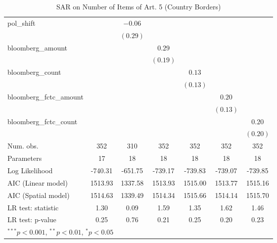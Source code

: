 \begin{table}[!h]
\begin{center}
\begin{tabular}{l c c c c c c }
pol\_shift              &              & $-0.06$      &              &              &              &              \\
                        &              & $(0.29)$     &              &              &              &              \\
bloomberg\_amount       &              &              & $0.29$       &              &              &              \\
                        &              &              & $(0.19)$     &              &              &              \\
bloomberg\_count        &              &              &              & $0.13$       &              &              \\
                        &              &              &              & $(0.13)$     &              &              \\
bloomberg\_fctc\_amount &              &              &              &              & $0.20$       &              \\
                        &              &              &              &              & $(0.13)$     &              \\
bloomberg\_fctc\_count  &              &              &              &              &              & $0.20$       \\
                        &              &              &              &              &              & $(0.20)$     \\
\midrule
Num. obs.               & 352          & 310          & 352          & 352          & 352          & 352          \\
Parameters              & 17           & 18           & 18           & 18           & 18           & 18           \\
Log Likelihood          & -740.31      & -651.75      & -739.17      & -739.83      & -739.07      & -739.85      \\
AIC (Linear model)      & 1513.93      & 1337.58      & 1513.93      & 1515.00      & 1513.77      & 1515.16      \\
AIC (Spatial model)     & 1514.63      & 1339.49      & 1514.34      & 1515.66      & 1514.14      & 1515.70      \\
LR test: statistic      & 1.30         & 0.09         & 1.59         & 1.35         & 1.62         & 1.46         \\
LR test: p-value        & 0.25         & 0.76         & 0.21         & 0.25         & 0.20         & 0.23         \\
\bottomrule
\multicolumn{7}{l}{\scriptsize{$^{***}p<0.001$, $^{**}p<0.01$, $^*p<0.05$}}
\end{tabular}
\caption{SAR on Number of Items of Art. 5 (Country Borders)}
\label{table:coefficients}
\end{center}
\end{table}
